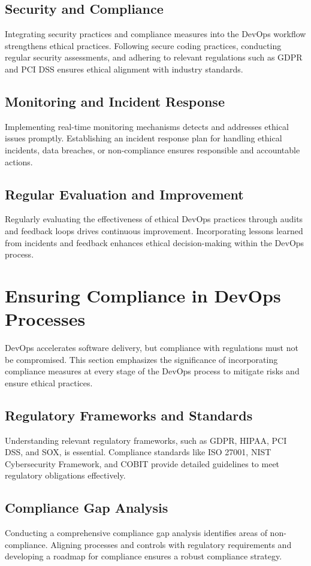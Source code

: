 \documentclass[conference]{IEEEtran}
\begin{document}
\subsection{Security and Compliance}
Integrating security practices and compliance measures into the DevOps workflow strengthens ethical practices. Following secure coding practices, conducting regular security assessments, and adhering to relevant regulations such as GDPR and PCI DSS ensures ethical alignment with industry standards.

\subsection{Monitoring and Incident Response}
Implementing real-time monitoring mechanisms detects and addresses ethical issues promptly. Establishing an incident response plan for handling ethical incidents, data breaches, or non-compliance ensures responsible and accountable actions.

\subsection{Regular Evaluation and Improvement}
Regularly evaluating the effectiveness of ethical DevOps practices through audits and feedback loops drives continuous improvement. Incorporating lessons learned from incidents and feedback enhances ethical decision-making within the DevOps process.


\section{Ensuring Compliance in DevOps Processes}

DevOps accelerates software delivery, but compliance with regulations must not be compromised. This section emphasizes the significance of incorporating compliance measures at every stage of the DevOps process to mitigate risks and ensure ethical practices.

\subsection{Regulatory Frameworks and Standards}
Understanding relevant regulatory frameworks, such as GDPR, HIPAA, PCI DSS, and SOX, is essential. Compliance standards like ISO 27001, NIST Cybersecurity Framework, and COBIT provide detailed guidelines to meet regulatory obligations effectively.

\subsection{Compliance Gap Analysis}
Conducting a comprehensive compliance gap analysis identifies areas of non-compliance. Aligning processes and controls with regulatory requirements and developing a roadmap for compliance ensures a robust compliance strategy.
\end{document}
